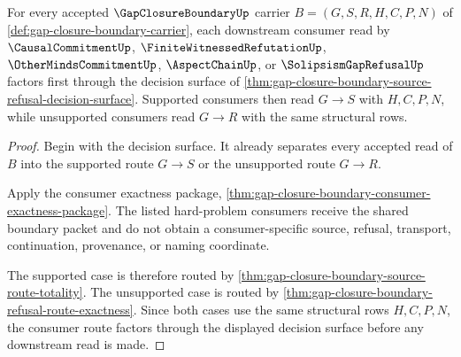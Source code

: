 \begin{theorem}
\label{thm:gap-closure-boundary-consumer-route-factorization}
For every accepted $\GapClosureBoundaryUp$ carrier $B=(G,S,R,H,C,P,N)$ of \autoref{def:gap-closure-boundary-carrier}, each downstream consumer read by $\CausalCommitmentUp$, $\FiniteWitnessedRefutationUp$, $\OtherMindsCommitmentUp$, $\AspectChainUp$, or $\SolipsismGapRefusalUp$ factors first through the decision surface of \autoref{thm:gap-closure-boundary-source-refusal-decision-surface}. Supported consumers then read $G \longrightarrow S$ with $H,C,P,N$, while unsupported consumers read $G \longrightarrow R$ with the same structural rows.
\end{theorem}
\begin{proof}
Begin with the decision surface. It already separates every accepted read of $B$ into the supported route $G \longrightarrow S$ or the unsupported route $G \longrightarrow R$.

Apply the consumer exactness package, \autoref{thm:gap-closure-boundary-consumer-exactness-package}. The listed hard-problem consumers receive the shared boundary packet and do not obtain a consumer-specific source, refusal, transport, continuation, provenance, or naming coordinate.

The supported case is therefore routed by \autoref{thm:gap-closure-boundary-source-route-totality}. The unsupported case is routed by \autoref{thm:gap-closure-boundary-refusal-route-exactness}. Since both cases use the same structural rows $H,C,P,N$, the consumer route factors through the displayed decision surface before any downstream read is made.
\end{proof}


